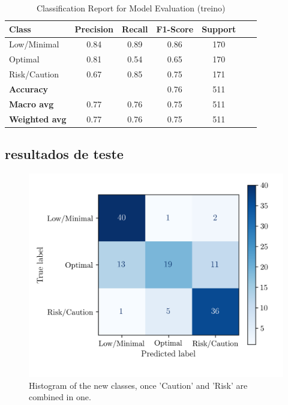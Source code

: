 \documentclass[conference]{IEEEtran}
\begin{document}
\begin{table}[H]
\centering
\caption{Classification Report for Model Evaluation (treino)}
\begin{tabular}{lcccccc}
\toprule
\textbf{Class} & \textbf{Precision} & \textbf{Recall} & \textbf{F1-Score} & \textbf{Support} \\
\midrule
Low/Minimal & 0.84 & 0.89 & 0.86 & 170 \\
Optimal & 0.81 & 0.54 & 0.65 & 170 \\
Risk/Caution & 0.67 & 0.85 & 0.75 & 171 \\
\midrule
\textbf{Accuracy} &  &  & 0.76 & 511 \\
\textbf{Macro avg} & 0.77 & 0.76 & 0.75 & 511 \\
\textbf{Weighted avg} & 0.77 & 0.76 & 0.75 & 511 \\
\bottomrule
\end{tabular}
\end{table}


\subsection{resultados de teste}

\begin{figure}[H]
    \centering
    \includegraphics[width=1\linewidth]{assets/SVM_ConfusionMatrixTest.png}
    \caption{Histogram of the new classes, once 'Caution' and 'Risk' are combined in one.}
    \label{svm_cm_test}
\end{figure}
\end{document}
